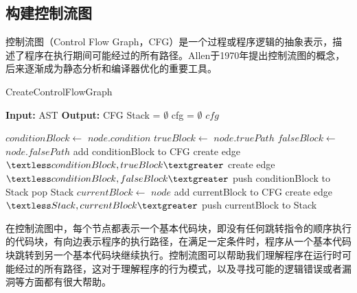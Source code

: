 \subsection{构建控制流图}
\label{sec:构建控制流图}
控制流图（Control Flow Graph，CFG）是一个过程或程序逻辑的抽象表示，描述了程序在执行期间可能经过的所有路径。Allen于1970年提出控制流图的概念\cite{allencfg}，后来逐渐成为静态分析和编译器优化的重要工具。

\begin{algorithm}
    \caption{CreateControlFlowGraph}
    \label{alg:gen_cfg}
    \begin{algorithmic}[1]
    
    
        \State \textbf{Input:} AST
        \State \textbf{Output:} CFG
        \State Stack = $\emptyset$ \State cfg = $\emptyset$
        \State {}
        \State \Return $cfg$
    
    
         \State \Return
        \EndIf
            \State $conditionBlock \gets$ $node.condition$
            \State $trueBlock \gets$ $node.truePath$
            \State $falseBlock \gets$ $node.falsePath$
            \State add conditionBlock to CFG
            \State create edge $\textless conditionBlock, trueBlock \textgreater$
            \State create edge $\textless conditionBlock, falseBlock \textgreater$
            \State push conditionBlock to Stack
            \State {}
            \State {}
            \State pop Stack
        \Else
            \State $currentBlock \gets$ $node$
            \State add currentBlock to CFG
                \State create edge $\textless Stack, currentBlock \textgreater$
            \EndIf
            \State push currentBlock to Stack
        \EndIf
            \State {}
        \EndFor
    \EndFunction
    
    \end{algorithmic}
    \end{algorithm}

在控制流图中，每个节点都表示一个基本代码块，即没有任何跳转指令的顺序执行的代码块，有向边表示程序的执行路径，在满足一定条件时，程序从一个基本代码块跳转到另一个基本代码块继续执行。控制流图可以帮助我们理解程序在运行时可能经过的所有路径，这对于理解程序的行为模式，以及寻找可能的逻辑错误或者漏洞等方面都有很大帮助。

